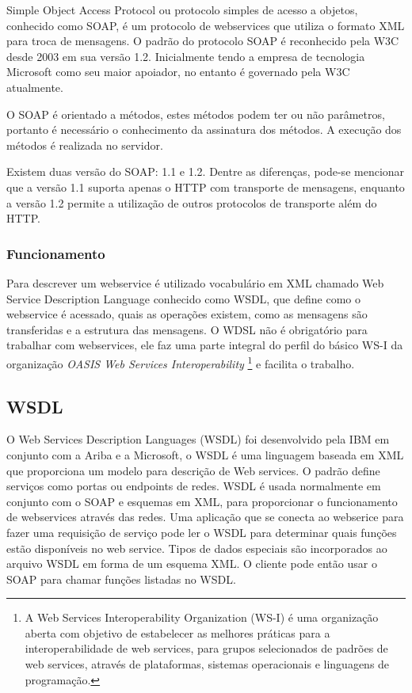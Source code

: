 \documentclass{acm_proc_article-sp}
\begin{document}
			Simple Object Access Protocol ou protocolo simples de acesso a objetos, conhecido como SOAP, é um protocolo de webservices que utiliza o formato XML para troca de mensagens. O padrão do protocolo SOAP é reconhecido pela W3C desde 2003 em sua versão 1.2. Inicialmente tendo a empresa de tecnologia Microsoft como seu maior apoiador, no entanto é governado pela W3C atualmente.
		
			O SOAP é orientado a métodos, estes métodos podem ter ou não parâmetros, portanto é necessário o conhecimento da assinatura dos métodos. A execução dos métodos é realizada no servidor.
		
			Existem duas versão do SOAP: 1.1 e 1.2. Dentre as diferenças, pode-se mencionar que a versão 1.1 suporta apenas o HTTP com transporte de mensagens, enquanto a versão 1.2 permite a utilização de outros protocolos de transporte além do HTTP. \cite{WEBSERVICESZEND}
		
		\subsubsection{Funcionamento}
		
			Para descrever um webservice é utilizado vocabulário em XML chamado Web Service Description Language conhecido como WSDL, que define como o webservice é acessado, quais as operações existem, como as mensagens são transferidas e a estrutura das mensagens. O WDSL não é obrigatório para trabalhar com webservices, ele faz uma parte integral do perfil do básico WS-I da organização \emph{OASIS Web Services Interoperability} \footnote{A Web Services Interoperability Organization (WS-I) é uma organização aberta com objetivo de estabelecer as melhores práticas para a interoperabilidade de web services, para grupos selecionados de padrões de web services, através de plataformas, sistemas operacionais e linguagens de programação.\cite{OASIS-WS-I-SITE}} e facilita o trabalho. 
			
		
		
	\subsection{WSDL}
		
		O Web Services Description Languages (WSDL) foi desenvolvido pela IBM em conjunto com a Ariba e a Microsoft, o WSDL é uma linguagem baseada em XML que proporciona um modelo para descrição de Web services. O padrão define serviços como portas ou endpoints de redes. WSDL é usada normalmente em conjunto com o SOAP e esquemas em XML, para proporcionar o funcionamento de webservices através das redes. Uma aplicação que se conecta ao webserice para fazer uma requisição de serviço pode ler o WSDL para determinar quais funções estão disponíveis no web service. Tipos de dados especiais são incorporados ao arquivo WSDL em forma de um esquema XML. O cliente pode então usar o SOAP para chamar funções listadas no WSDL.
		
\end{document}
